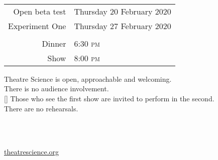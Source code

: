 \documentclass{article}
\begin{document}
  \thispagestyle{empty}

  \begin{center}

    \vspace*{2in}


    \vspace{1in}

    \\
    \vspace{0.5cm}
    \\
    \vspace{0.5cm}
    \\

    \vspace{1in}

    {\Huge


      \vspace{0.5in}

      \begin{tabular}{rl}

        Open beta test       & Thursday 20 February 2020 \\
        Experiment One  & Thursday 27 February 2020 \\
        & \\
        Dinner & 6:30 \textsc{pm} \\
        Show   & 8:00 \textsc{pm}

      \end{tabular}


      \vspace{1in}

      Theatre Science is open, approachable and welcoming.  \\
      There is no audience involvement.\\
      [\baselineskip]
      Those who see the first show are invited to perform in the second.\\
      There are no rehearsals.

    }

    \vspace{1.5in}

    \\
    \vspace{0.2cm}
    \\

    \vspace{1in}

    {\Huge \url{theatrescience.org} \\ \ccby }

\end{center}
\end{document}
